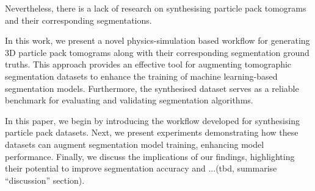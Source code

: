 \documentclass[preprint,12pt]{elsarticle}
\begin{document}
Nevertheless, there is a lack of research on synthesising particle pack tomograms and their corresponding segmentations.
\par
In this work, we present a novel physics-simulation based workflow for generating 3D particle pack tomograms along with their corresponding segmentation ground truths. 
This approach provides an effective tool for augmenting tomographic segmentation datasets to enhance the training of machine learning-based segmentation models.
Furthermore, the synthesised dataset serves as a reliable benchmark for evaluating and validating segmentation algorithms.
\par
In this paper, we begin by introducing the workflow developed for synthesising particle pack datasets.
Next, we present experiments demonstrating how these datasets can augment segmentation model training, enhancing model performance.
Finally, we discuss the implications of our findings, highlighting their potential to improve segmentation accuracy and ...(tbd, summarise ``discussion'' section).
\end{document}
